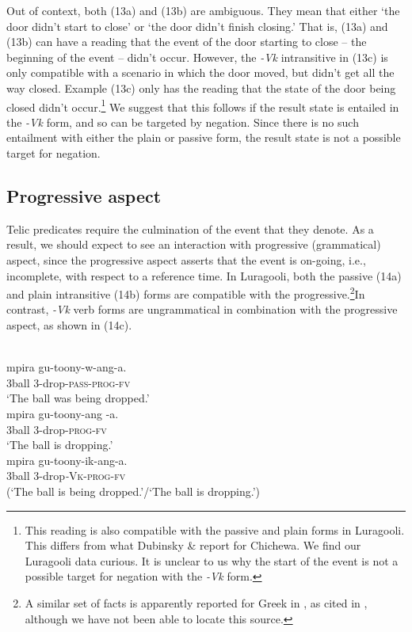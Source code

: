 \documentclass[output=paper]{langsci/langscibook}
\begin{document}
Out of context, both (13a) and (13b) are ambiguous. They mean that either ‘the door didn’t start to close’ or ‘the door didn’t finish closing.’ That is, (13a) and (13b) can have a reading that the event of the door starting to close – the beginning of the event – didn’t occur. However, the \textit{-Vk }intransitive in (13c) is only compatible with a scenario in which the door moved, but didn’t get all the way closed. Example (13c) only has the reading that the state of the door being closed didn’t occur.\footnote{ This reading is also compatible with the passive and plain forms in Luragooli. This differs from what Dubinsky \& \citet{Simango1996} report for Chichewa. We find our Luragooli data curious. It is unclear to us why the start of the event is not a possible target for negation with the \textit{-Vk} form. } We suggest that this follows if the result state is entailed in the \textit{-Vk} form, and so can be targeted by negation. Since there is no such entailment with either the plain or passive form, the result state is not a possible target for negation.

\subsection{Progressive aspect}

Telic predicates require the culmination of the event that they denote. As a result, we should expect to see an interaction with progressive (grammatical) aspect, since the progressive aspect asserts that the event is on-going, i.e., incomplete, with respect to a reference time. In Luragooli, both the passive (14a) and plain intransitive (14b) forms are compatible with the progressive.\footnote{ A similar set of facts is apparently reported for Greek in \citet{Mavromanolaki2002}, as cited in \citet{AlexiadouEtAl2015}, although we have not been able to locate this source. }In contrast, \textit{-Vk} verb forms are ungrammatical in combination with the progressive aspect, as shown in (14c).

\ea\label{exx:}
\ea
{}\\
\gll mpira gu-toony-w-ang-a.\\
     3ball  3-drop-\textsc{pass}-\textsc{prog}-\textsc{fv}\\
\glt ‘The ball was being dropped.’
\ex
{}\\
\gll mpira gu-toony-ang -a.\\
     3ball  3-drop-\textsc{prog}-\textsc{fv}\\
\glt ‘The ball is dropping.’
\ex
{}\\
\gll *mpira gu-toony-ik-ang-a.\\
     \textit{ }3ball    3-drop\textit{-}\textsc{Vk}-\textsc{prog}-\textsc{fv}\\
\glt  (‘The ball is being dropped.’/‘The ball is dropping.’)
\z
\z
\end{document}
